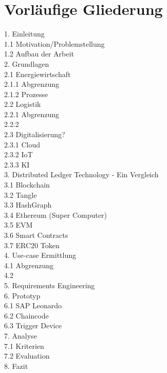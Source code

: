 \section{Vorläufige Gliederung}
1. Einleitung\\
1.1 Motivation/Problemstellung\\
1.2 Aufbau der Arbeit\\
2. Grundlagen\\
2.1 Energiewirtschaft\\
2.1.1 Abgrenzung\\
2.1.2 Prozesse\\
2.2 Logistik\\
2.2.1 Abgrenzung\\
2.2.2 \\
2.3 Digitalisierung?\\
2.3.1 Cloud\\
2.3.2 IoT\\
2.3.3 KI\\
3. Distributed Ledger Technology - Ein Vergleich\\
3.1 Blockchain\\
3.2 Tangle\\
3.3 HashGraph\\
3.4 Ethereum (Super Computer)\\
3.5 EVM\\
3.6 Smart Contracts\\
3.7 ERC20 Token\\
4. Use-case Ermittlung\\
4.1 Abgrenzung\\
4.2 \\
5. Requirements Engineering\\
6. Prototyp\\
6.1 SAP Leonardo\\
6.2 Chaincode\\
6.3 Trigger Device\\
7. Analyse\\
7.1 Kriterien\\
7.2 Evaluation\\
8. Fazit\\

\newpage